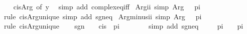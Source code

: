 \begin{isabellebody}
%
\isadelimproof
\ \ %
\endisadelimproof
%
\isatagproof
{}\isamarkupfalse%
\ cis{\isacharunderscore}{\kern0pt}Arg\ {\isacharbrackleft}{\kern0pt}of\ y{\isacharbrackright}{\kern0pt}\ \isamarkupfalse%
\ {\isacharparenleft}{\kern0pt}simp\ add{\isacharcolon}{\kern0pt}\ complex{\isacharunderscore}{\kern0pt}eq{\isacharunderscore}{\kern0pt}iff{\isacharparenright}{\kern0pt}%
\endisatagproof
{\isafoldproof}%
%
\isadelimproof
\isanewline
%
\endisadelimproof
\isanewline
{}\isamarkupfalse%
\ Arg{\isacharunderscore}{\kern0pt}ii\ {\isacharbrackleft}{\kern0pt}simp{\isacharbrackright}{\kern0pt}{\isacharcolon}{\kern0pt}\ {\isachardoublequoteopen}Arg\ {\isasymi}\ {\isacharequal}{\kern0pt}\ pi{\isacharslash}{\kern0pt}{}{\isachardoublequoteclose}\isanewline
%
\isadelimproof
\ \ %
\endisadelimproof
%
\isatagproof
{}\isamarkupfalse%
\ {\isacharparenleft}{\kern0pt}rule\ cis{\isacharunderscore}{\kern0pt}Arg{\isacharunderscore}{\kern0pt}unique{\isacharsemicolon}{\kern0pt}\ simp\ add{\isacharcolon}{\kern0pt}\ sgn{\isacharunderscore}{\kern0pt}eq{\isacharparenright}{\kern0pt}%
\endisatagproof
{\isafoldproof}%
%
\isadelimproof
\isanewline
%
\endisadelimproof
\isanewline
{}\isamarkupfalse%
\ Arg{\isacharunderscore}{\kern0pt}minus{\isacharunderscore}{\kern0pt}ii\ {\isacharbrackleft}{\kern0pt}simp{\isacharbrackright}{\kern0pt}{\isacharcolon}{\kern0pt}\ {\isachardoublequoteopen}Arg\ {\isacharparenleft}{\kern0pt}{\isacharminus}{\kern0pt}{\isasymi}{\isacharparenright}{\kern0pt}\ {\isacharequal}{\kern0pt}\ {\isacharminus}{\kern0pt}pi{\isacharslash}{\kern0pt}{}{\isachardoublequoteclose}\isanewline
%
\isadelimproof
%
\endisadelimproof
%
\isatagproof
{}\isamarkupfalse%
\ {\isacharparenleft}{\kern0pt}rule\ cis{\isacharunderscore}{\kern0pt}Arg{\isacharunderscore}{\kern0pt}unique{\isacharparenright}{\kern0pt}\isanewline
\ \ \isamarkupfalse%
\ {\isachardoublequoteopen}sgn\ {\isacharparenleft}{\kern0pt}{\isacharminus}{\kern0pt}\ {\isasymi}{\isacharparenright}{\kern0pt}\ {\isacharequal}{\kern0pt}\ cis\ {\isacharparenleft}{\kern0pt}{\isacharminus}{\kern0pt}\ pi\ {\isacharslash}{\kern0pt}\ {}{\isacharparenright}{\kern0pt}{\isachardoublequoteclose}\isanewline
\ \ \ \ \isamarkupfalse%
\ {\isacharparenleft}{\kern0pt}simp\ add{\isacharcolon}{\kern0pt}\ sgn{\isacharunderscore}{\kern0pt}eq{\isacharparenright}{\kern0pt}\isanewline
\ \ \isamarkupfalse%
\ {\isachardoublequoteopen}{\isacharminus}{\kern0pt}\ pi\ {\isacharslash}{\kern0pt}\ {}\ {\isasymle}\ pi{\isachardoublequoteclose}\isanewline

\end{isabellebody}

